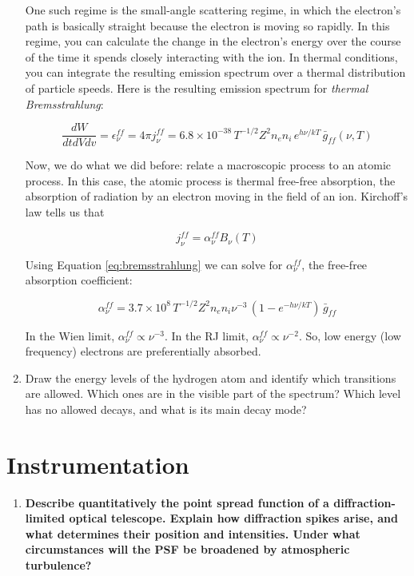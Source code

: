 \documentclass[12pt, letterpaper, preprint]{aastex}
\begin{document}
\begin{enumerate}
One such regime is the small-angle scattering regime, in which the electron's path is basically straight because the electron is moving so rapidly. In this regime, you can calculate the change in the electron's energy over the course of the time it spends closely interacting with the ion. In thermal conditions, you can integrate the resulting emission spectrum over a thermal distribution of particle speeds. Here is the resulting emission spectrum for \emph{thermal Bremsstrahlung}:

\begin{equation}
  \frac{dW}{dt dV dv} = \epsilon_\nu^{ff} = 4 \pi j_\nu^{ff} 
  = 6.8 \times 10^{-38} \, T^{-1/2} Z^2 n_e n_i \, e^{h \nu / kT}
  \, \bar{g}_{ff} (\nu,T)
  \label{eq:bremsstrahlung}
\end{equation}

Now, we do what we did before: relate a macroscopic process to an atomic process. In this case, the atomic process is thermal free-free absorption, the absorption of radiation by an electron moving in the field of an ion. Kirchoff's law tells us that

$$ j_\nu^{ff} = \alpha_\nu^{ff} B_\nu (T) $$

Using Equation \ref{eq:bremsstrahlung} we can solve for $\alpha_\nu^{ff}$, the free-free absorption coefficient:

\begin{equation}
\alpha_\nu^{ff} = 3.7 \times 10^8 \, T^{-1/2} Z^2 n_e n_i \nu^{-3} \, (1-e^{-h\nu/kT}) \, \bar{g}_{ff}
\end{equation}

In the Wien limit, $\alpha_\nu^{ff} \propto \nu^{-3}$.
In the RJ limit, $\alpha_\nu^{ff} \propto \nu^{-2}$.
So, low energy (low frequency) electrons are
preferentially absorbed. 

  \item Draw the energy levels of the hydrogen atom and 
    identify which transitions are allowed. 
    Which ones are in the visible part of the spectrum? 
    Which level has no allowed decays, and what is its main decay mode?
\end{enumerate}

\section*{Instrumentation}

\begin{enumerate}
  \item \textbf{Describe quantitatively the point spread function 
      of a diffraction-limited optical telescope. 
      Explain how diffraction spikes arise, 
      and what determines their position and intensities. 
      Under what circumstances will the PSF be broadened by atmospheric
      turbulence?}
\end{enumerate}
\end{document}
